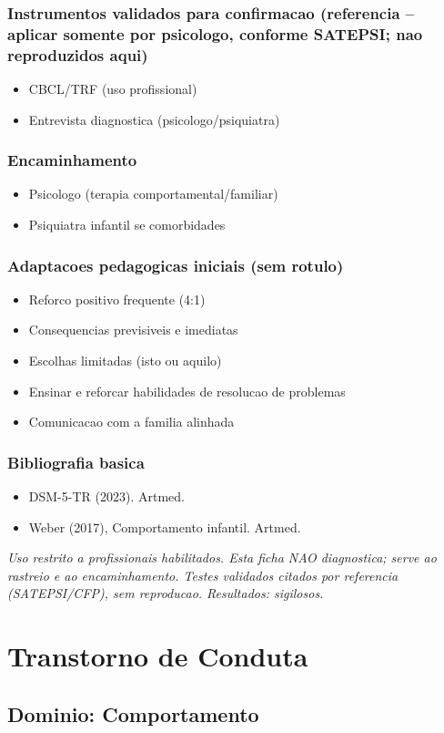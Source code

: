 \documentclass[a4paper,11pt]{book}
\newcommand{\avisolegal}{\par\medskip\noindent\footnotesize\itshape
\color{cinza}Uso restrito a profissionais habilitados. Esta ficha NAO diagnostica;
serve ao rastreio e ao encaminhamento. Testes validados citados por referencia
(SATEPSI/CFP), sem reproducao. Resultados: sigilosos.\color{black}\par}
\begin{document}
\subsection*{Instrumentos validados para confirmacao (referencia -- aplicar somente por psicologo, conforme SATEPSI; nao reproduzidos aqui)}
\begin{itemize}
\item CBCL/TRF (uso profissional)
\item Entrevista diagnostica (psicologo/psiquiatra)
\end{itemize}
\subsection*{Encaminhamento}
\begin{itemize}
\item Psicologo (terapia comportamental/familiar)
\item Psiquiatra infantil se comorbidades
\end{itemize}
\subsection*{Adaptacoes pedagogicas iniciais (sem rotulo)}
\begin{itemize}
\item Reforco positivo frequente (4:1)
\item Consequencias previsiveis e imediatas
\item Escolhas limitadas (isto ou aquilo)
\item Ensinar e reforcar habilidades de resolucao de problemas
\item Comunicacao com a familia alinhada
\end{itemize}
\subsection*{Bibliografia basica}
\begin{itemize}
\item DSM-5-TR (2023). Artmed.
\item Weber (2017), Comportamento infantil. Artmed.
\end{itemize}
\avisolegal


\chapter{Transtorno de Conduta}
\section*{Dominio: Comportamento}
\end{document}
